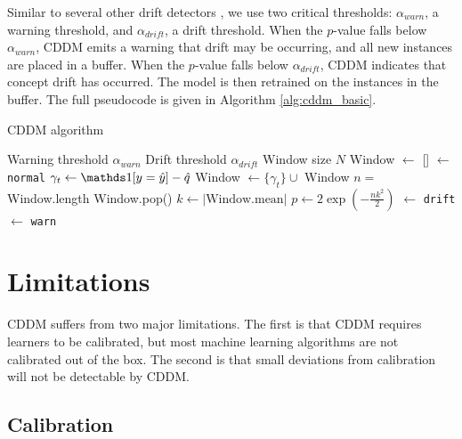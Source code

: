 Similar to several other drift detectors \cite{DDM}\cite{HDDM}\cite{FLORA}, we use two critical thresholds: $\alpha_{warn}$, a warning threshold, and $\alpha_{drift}$, a drift threshold. When the $p$-value falls below $\alpha_{warn}$, CDDM emits a warning that drift may be occurring, and all new instances are placed in a buffer. When the $p$-value falls below $\alpha_{drift}$, CDDM indicates that concept drift has occurred. The model is then retrained on the instances in the buffer. The full pseudocode is given in Algorithm \ref{alg:cddm_basic}.

\begin{algorithm}
    \caption{CDDM algorithm}
    \label{alg:cddm_basic}
    \begin{algorithmic}
    \Require Warning threshold $\alpha_{warn}$
    \Require Drift threshold $\alpha_{drift}$
    \Require Window size $N$
    \State Window $\gets$ []
     $\gets$ {\tt normal}
        \State $\gamma_t \gets \id{y=\hat{y}} - \hat{q}$
        \State Window $\gets \{\gamma_t\} \cup$ Window
        \State $n =$ Window.length
            \State Window.pop()
        \EndIf
        \State $k \gets \left| \text{Window.mean} \right|$
        \State $p \gets 2\exp\left(-\frac{nk^2}{2}\right)$
             $\gets$ {\tt drift}
             $\gets$ {\tt warn}
        \EndIf
    \EndFor
    \end{algorithmic}
\end{algorithm}


\section{Limitations} \label{CDDM:limitations}

CDDM suffers from two major limitations. The first is that CDDM requires learners to be calibrated, but most machine learning algorithms are not calibrated out of the box. The second is that small deviations from calibration will not be detectable by CDDM.

\subsection{Calibration}

